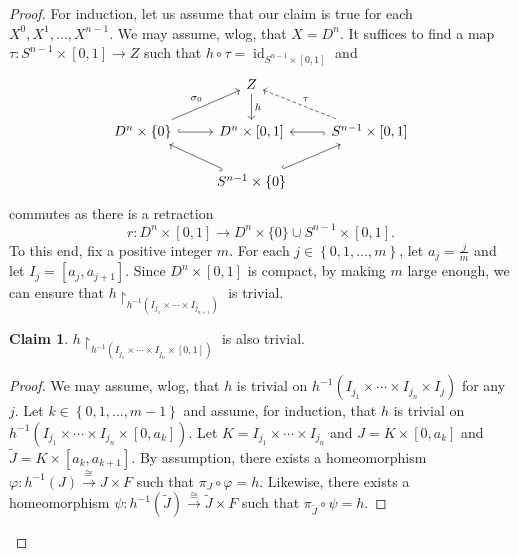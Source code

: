 \documentclass[10pt,letterpaper,cm]{nupset}
\theoremstyle{definition}
\theoremstyle{theorem}
\newtheorem*{claim}{Claim}
\theoremstyle{remark}
\newcommand{\1}{\mathbb{1}}
\newcommand{\0}{\vec 0}
\DeclareMathOperator{\id}{id}
\begin{document}
\begin{proof}
For induction, let us assume that our claim is true for each $X^0, X^1, \ldots, X^{n-1}$. We may assume, wlog, that $X = D^n$. It suffices to find a map $\tau : S^{n-1} \times [0,1] \to Z$ such that $h \circ \tau = \id_{S^{n-1}\times [0,1]}$ and
\[
\begin{tikzcd}
                                                        & Z \arrow[d, "h"]                                       &                                                           \\
D^n \times \{0\} \arrow[r, hook] \arrow[ru, "\sigma_0"] & {D^n \times [0,1]}                                     & {S^{n-1}\times [0,1]} \arrow[l, hook] \arrow[lu, "\tau"', dashed] \\
                                                        & S^{n-1} \times \{0\} \arrow[lu, hook] \arrow[ru, hook] &                                                          
\end{tikzcd}
\] commutes as there is a retraction $$r: D^n \times [0,1] \to D^{n} \times \{0\} \cup S^{n-1}\times [0,1].$$ To this end, fix a positive integer $m$. For each $j\in \left\{0,1, \ldots, m\right\}$, let $a_j = \frac{j}{m}$ and let $I_j = \left[a_j, a_{j+1}\right]$. Since $D^n \times [0,1]$ is compact,  by making $m$ large enough, we can ensure that $h\restriction_{h^{-1}(I_{j_1} \times \cdots \times I_{j_{n+1}})}$ is trivial.
\begin{claim}
$h\restriction_{h^{-1}(I_{j_1} \times \cdots \times I_{j_n} \times  [0,1])}$ is also trivial. 
\end{claim}
\begin{proof}
We may assume, wlog, that $h$ is trivial on $h^{-1}(I_{j_1} \times \cdots \times I_{j_n} \times  I_j)$ for any $j$. Let $k\in \left\{0, 1, \ldots, m-1\right\}$ and assume, for induction, that $h$ is trivial on $h^{-1}(I_{j_1} \times \cdots \times I_{j_n} \times  \left[0,a_k\right])$. Let $K = I_{j_1} \times \cdots \times I_{j_n}$ and $J = K\times \left[0, a_k\right]$ and $\tilde{J}= K\times \left[a_k, a_{k+1}\right]$. By assumption, there exists a homeomorphism $\varphi :h^{-1}(J) \overset{\cong}{\longrightarrow} J\times F$ such that $\pi_J \circ \varphi =h$. Likewise, there exists a homeomorphism $\psi : h^{-1}(\tilde{J}) \overset{\cong}{\longrightarrow} \tilde{J} \times F$ such that $\pi_{\tilde{J}} \circ \psi = h$.

\smallskip


\end{proof}
\end{proof}
\end{document}
